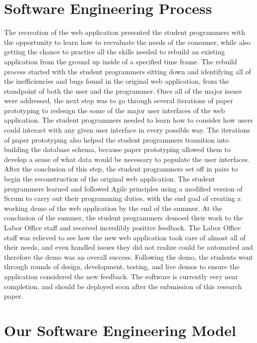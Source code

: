 \section{Software Engineering Process}

The recreation of the web application presented the student programmers with the opportunity to learn how to reevaluate the needs of the consumer, while also getting the chance to practice all the skills needed to rebuild an existing application from the ground up inside of a specified time frame. The rebuild process started with the student programmers sitting down and identifying all of the inefficiencies and bugs found in the original web application, from the standpoint of both the user and the programmer. Once all of the major issues were addressed, the next step was to go through several iterations of paper prototyping to redesign the some of the major user interfaces of the web application. The student programmers needed to learn how to consider how users could interact with any given user interface in every possible way. The iterations of paper prototyping also helped the student programmers transition into building the database schema, because paper prototyping allowed them to develop a sense of what data would be necessary to populate the user interfaces. After the conclusion of this step, the student programmers set off in pairs to begin the reconstruction of the original web application. The student programmers learned and followed Agile principles using a modified version of Scrum to carry out their programming duties, with the end goal of creating a working demo of the web application by the end of the summer. At the conclusion of the summer, the student programmers demoed their work to the Labor Office staff and received incredibly positive feedback. The Labor Office staff was relieved to see how the new web application took care of almost all of their needs, and even handled issues they did not realize could be automated and therefore the demo was an overall success. Following the demo, the students went through rounds of design, development, testing, and live demos to ensure the application considered the new feedback. The software is currently very near completion, and should be deployed soon after the submission of this research paper.


\section{Our Software Engineering Model}

